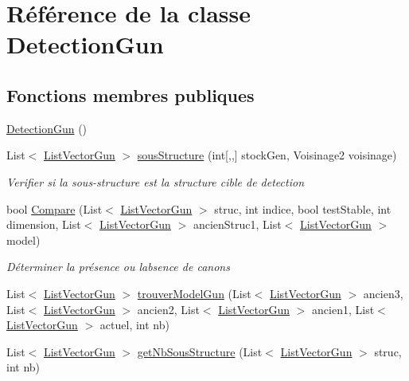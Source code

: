 \hypertarget{class_detection_gun}{}\section{Référence de la classe Detection\+Gun}
\label{class_detection_gun}
\subsection*{Fonctions membres publiques}
\begin{DoxyCompactItemize}
\item 
\mbox{\hyperlink{class_detection_gun_a7fd1d6b8de83ef57d12bf0337833372b}{Detection\+Gun}} ()
\item 
List$<$ \mbox{\hyperlink{class_list_vector_gun}{List\+Vector\+Gun}} $>$ \mbox{\hyperlink{class_detection_gun_af804b47fcbcc2c89bbe17b47eb8f7c47}{sous\+Structure}} (int\mbox{[},,\mbox{]} stock\+Gen, Voisinage2 voisinage)
\begin{DoxyCompactList}\small\item\em Verifier si la sous-\/structure est la structure cible de detection \end{DoxyCompactList}\item 
bool \mbox{\hyperlink{class_detection_gun_a664491436b7ca39a34f4146754a6ae71}{Compare}} (List$<$ \mbox{\hyperlink{class_list_vector_gun}{List\+Vector\+Gun}} $>$ struc, int indice, bool test\+Stable, int dimension, List$<$ \mbox{\hyperlink{class_list_vector_gun}{List\+Vector\+Gun}} $>$ ancien\+Struc1, List$<$ \mbox{\hyperlink{class_list_vector_gun}{List\+Vector\+Gun}} $>$ model)
\begin{DoxyCompactList}\small\item\em Déterminer la présence ou l\textquotesingle{}absence de canons \end{DoxyCompactList}\item 
List$<$ \mbox{\hyperlink{class_list_vector_gun}{List\+Vector\+Gun}} $>$ \mbox{\hyperlink{class_detection_gun_aaafe20e9ecbfe9e95e2f36ac49701d3d}{trouver\+Model\+Gun}} (List$<$ \mbox{\hyperlink{class_list_vector_gun}{List\+Vector\+Gun}} $>$ ancien3, List$<$ \mbox{\hyperlink{class_list_vector_gun}{List\+Vector\+Gun}} $>$ ancien2, List$<$ \mbox{\hyperlink{class_list_vector_gun}{List\+Vector\+Gun}} $>$ ancien1, List$<$ \mbox{\hyperlink{class_list_vector_gun}{List\+Vector\+Gun}} $>$ actuel, int nb)
\item 
List$<$ \mbox{\hyperlink{class_list_vector_gun}{List\+Vector\+Gun}} $>$ \mbox{\hyperlink{class_detection_gun_a0a14866d2727aea5d457121bd646f3bb}{get\+Nb\+Sous\+Structure}} (List$<$ \mbox{\hyperlink{class_list_vector_gun}{List\+Vector\+Gun}} $>$ struc, int nb)

\end{DoxyCompactItemize}
